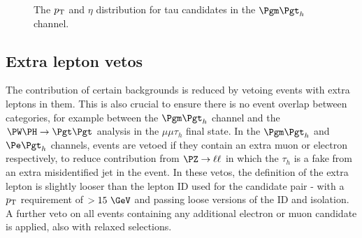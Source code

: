 \begin{figure}[htb]
\begin{center}

\end{center}
\caption{
The $p_{\mathrm{T}}$ and $\eta$ distribution for tau candidates in the $\mutau$
channel.
}
\label{fig:mutautaus}
\end{figure}

\subsection{Extra lepton vetos}

The contribution of certain backgrounds is reduced by vetoing events with extra
leptons in them. This is also crucial to ensure there is no event overlap
between categories, for example between the $\mutau$ channel and the
$\PW\PH\to\Pgt\Pgt$ analysis in the $\mu\mu\tau_{h}$ final state. In the
$\mutau$ and $\etau$ channels, events are vetoed if they contain an extra muon
or electron respectively, to reduce contribution from $\PZ\to\ell\ell$ in which
the $\tau_{h}$ is a fake from an extra misidentified jet in the event. In these
vetos, the definition of the extra lepton is slightly looser than the lepton ID
used for the candidate pair - with a $p_{\mathrm{T}}$ requirement of $> 15~\GeV$ and
passing loose versions of the ID and isolation. A further veto on all events
containing any additional electron or muon candidate is applied, also with
relaxed selections. 

